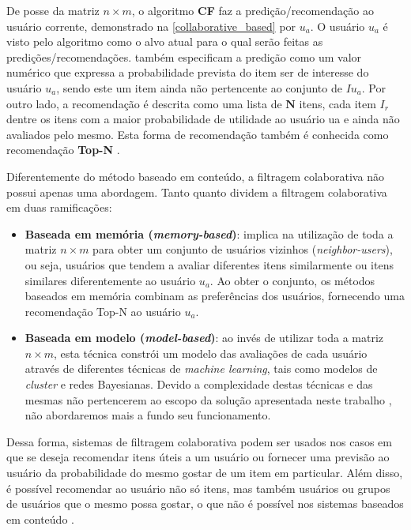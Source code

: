 \documentclass[12pt, openright, oneside, a4paper, brazil]{abntex2}
\begin{document}
De posse da matriz $n \times m$, o algoritmo \textbf{CF} faz a predição/recomendação ao usuário corrente, demonstrado na \autoref{collaborative_based} por $u_{a}$. O usuário $u_{a}$ é visto pelo algoritmo como o alvo atual para o qual serão feitas as predições/recomendações.  também especificam a predição como um valor numérico que expressa a probabilidade prevista do item ser de interesse do usuário $u_{a}$, sendo este um item ainda não pertencente ao conjunto de $Iu_{a}$. Por outro lado, a recomendação é descrita como uma lista de $\textbf{N}$ itens, cada item $I_{r}$ dentre os itens com a maior probabilidade de utilidade ao usuário ua e ainda não avaliados pelo mesmo. Esta forma de recomendação também é conhecida como recomendação \textbf{Top-N} \cite{adomavicius2005toward}.

Diferentemente do método baseado em conteúdo, a filtragem colaborativa não possui apenas uma abordagem. Tanto  quanto  dividem a filtragem colaborativa em duas ramificações:

\begin{itemize}
	\item \textbf{Baseada em memória (\textit{memory-based})}: implica na utilização de toda a matriz $n \times m$ para obter um conjunto de usuários vizinhos (\textit{neighbor-users}), ou seja, usuários que tendem a avaliar diferentes itens similarmente ou itens similares diferentemente ao usuário $u_{a}$. Ao obter o conjunto, os métodos baseados em memória combinam as preferências dos usuários, fornecendo uma recomendação Top-N ao usuário $u_{a}$.

	\item \textbf{Baseada em modelo (\textit{model-based})}: ao invés de utilizar toda a matriz $n \times m$, esta técnica constrói um modelo das avaliações de cada usuário através de diferentes técnicas de \textit{machine learning}, tais como modelos de \textit{cluster} e redes Bayesianas. Devido a complexidade destas técnicas e das mesmas não pertencerem ao escopo da solução apresentada neste trabalho , não abordaremos mais a fundo seu funcionamento.
\end{itemize}

Dessa forma, sistemas de filtragem colaborativa podem ser usados nos casos em que se deseja recomendar itens úteis a um usuário ou fornecer uma previsão ao usuário da probabilidade do mesmo gostar de um item em particular. Além disso, é possível recomendar ao usuário não só itens, mas também usuários ou grupos de usuários que o mesmo possa gostar, o que não é possível nos sistemas baseados em conteúdo \cite{schafer2007collaborative}.
\end{document}
